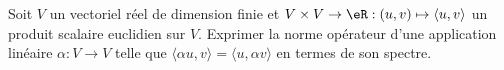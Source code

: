 
\begin{exercice}\label{exoSerieCinq0004}

Soit $V$ un vectoriel réel de dimension finie
et $V\times V\to\eR:(u,v)\mapsto  \langle u, v\rangle $ un produit scalaire euclidien sur $V$. Exprimer la norme opérateur d'une application linéaire $\alpha:V\to V$ telle que $\langle \alpha u, v\rangle =\langle u, \alpha v\rangle $ en termes de son spectre.

\end{exercice}
